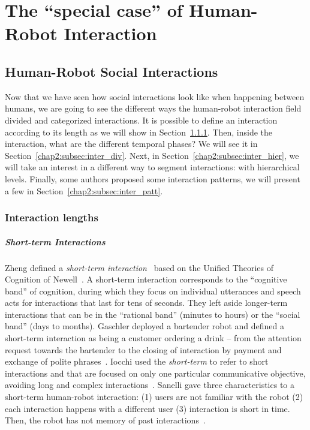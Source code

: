 \documentclass[a4paper,11pt,twoside]{StyleThese}
\begin{document}
	\setcounter{chapter}{1} %
	\dominitoc
	\faketableofcontents
	\fi


\chapter{The ``special case'' of Human-Robot Interaction}
\minitoc
\section{Human-Robot Social Interactions}\label{chap2:sec:soc_inter}

Now that we have seen how social interactions look like when happening between humans, we are going to see the different ways the human-robot interaction field divided and categorized interactions. It is possible to define an interaction according to its length as we will show in Section~\ref{chap2:subsec:inter_lengths}. Then, inside the interaction, what are the different temporal phases? We will see it in Section~\ref{chap2:subsec:inter_div}. Next, in Section~\ref{chap2:subsec:inter_hier}, we will take an interest in a different way to segment interactions: with hierarchical levels. Finally, some authors proposed some interaction patterns, we will present a few in Section~\ref{chap2:subsec:inter_patt}.

\subsection{Interaction lengths}\label{chap2:subsec:inter_lengths}
\paragraph{Short-term Interactions}
Zheng \etal{} defined a \emph{short-term interaction}~\cite{zheng_2013_designing} based on the Unified Theories of Cognition of Newell~\cite{newell_1994_unified}. A short-term interaction corresponds to the ``cognitive band'' of cognition, during which they focus on individual utterances and speech acts for interactions that last for tens of seconds. They left aside longer-term interactions that can be in the ``rational band'' (minutes to hours) or the ``social band'' (days to months).
Gaschler \etal{} deployed a bartender robot and defined a short-term interaction as being a customer ordering a drink – from the attention request towards the bartender to the closing of interaction by payment and exchange of polite phrases~\cite{gaschler_2012_modelling}.
Iocchi \etal{} used the \emph{short-term} to refer to short interactions and that are focused on only one particular communicative objective, avoiding long and complex interactions~\cite{iocchi_2015_personalized}.
Sanelli \etal{} gave three characteristics to a short-term human-robot interaction: (1) users are not familiar with the robot (2) each interaction happens with a different user (3) interaction is short in time. Then, the robot has not memory of past interactions~\cite{sanelli_2017_short}.
\end{document}
